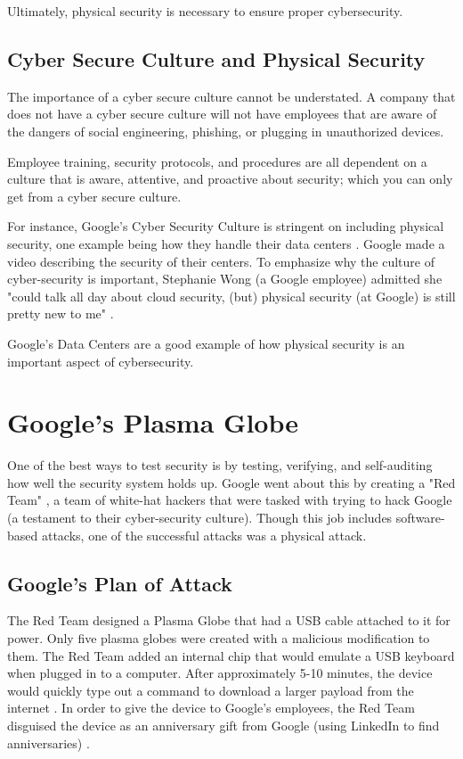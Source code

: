 \documentclass[acmsmall]{acmart}
\begin{document}
Ultimately, physical security is necessary to ensure proper cybersecurity.

\subsection{Cyber Secure Culture and Physical Security}
The importance of a cyber secure culture cannot be understated. A company
that does not have a cyber secure culture will not have employees that
are aware of the dangers of social engineering, phishing, or plugging in
unauthorized devices.

Employee training, security protocols, and procedures are all dependent
on a culture that is aware, attentive, and proactive about security;
which you can only get from a cyber secure culture.

For instance, Google's Cyber Security Culture is stringent on including
physical security, one example being how they handle their data centers \cite{GoogleData}.
Google made a video describing the security of their centers. To emphasize why
the culture of cyber-security is important,
Stephanie Wong (a Google employee) admitted she "could talk all day
about cloud security, (but) physical security (at Google) is still pretty new to me" \cite{GoogleDataVideo}.

Google's Data Centers are a good example of how physical security is an important
aspect of cybersecurity.

\section{Google's Plasma Globe}
One of the best ways to test security is by testing, verifying, and self-auditing
how well the security system holds up. Google went about this by creating a
"Red Team" \cite{GoogleRedTeamBlog}, a team of white-hat hackers that were tasked with
trying to hack Google (a testament to their cyber-security culture).
Though this job includes software-based attacks,
one of the successful attacks was a physical attack.

\subsection{Google's Plan of Attack}
The Red Team designed a Plasma Globe that had a USB cable attached to it for power.
Only five plasma globes were created with a malicious modification to them.
The Red Team added an internal chip that would emulate a USB keyboard when plugged
in to a computer. After approximately 5-10 minutes, the device would
quickly type out a command to download a larger payload from the internet \cite{GoogleGlobeBlog}.
In order to give the device to Google's employees, the Red Team disguised the
device as an anniversary gift from Google (using LinkedIn to find anniversaries) \cite{GoogleGlobeVideo}.
\end{document}
